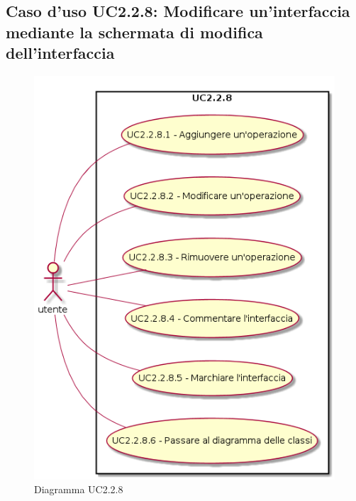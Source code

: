 \documentclass[../AnalisiDeiRequisiti.tex]{subfiles}
\begin{document}
			\subsection{Caso d'uso UC2.2.8: Modificare un'interfaccia mediante la schermata di modifica dell'interfaccia}
			\begin{figure} [H]
				\centering
				\includegraphics[scale=0.45]{./Figures/UC2-2-8.png}
				\caption{Diagramma UC2.2.8}\label{}
			\end{figure}
\end{document}

